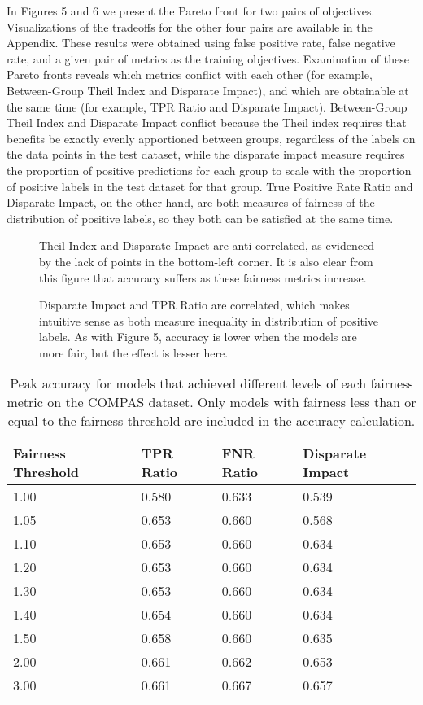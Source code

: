 \documentclass{elsarticle}
\newcommand{\figures}[4]{
	\begin{figure}[H]{
		\centering{
			\texttt{[image: \#1]}
		}
		\caption{#2}
		}
	\end{figure}
	\begin{figure}[H] {
		\centering{
			\texttt{[image: \#3]}
		}
		\caption{#4}
	}
	\end{figure}
}
\begin{document}
In Figures 5 and 6 we present the Pareto front for two pairs of objectives. Visualizations of the tradeoffs for the other four pairs are available in the Appendix. These results were obtained using false positive rate, false negative rate, and a given pair of metrics as the training objectives. Examination of these Pareto fronts reveals which metrics conflict with each other (for example, Between-Group Theil Index and Disparate Impact), and which are obtainable at the same time (for example, TPR Ratio and Disparate Impact). Between-Group Theil Index and Disparate Impact conflict because the Theil index requires that benefits be exactly evenly apportioned between groups, regardless of the labels on the data points in the test dataset, while the disparate impact measure requires the proportion of positive predictions for each group to scale with the proportion of positive labels in the test dataset for that group. True Positive Rate Ratio and Disparate Impact, on the other hand, are both measures of fairness of the distribution of positive labels, so they both can be satisfied at the same time. 

\figures{Between-Group Theil Index|Disparate Impact|COMPAS.png}{Theil Index and Disparate Impact are anti-correlated, as evidenced by the lack of points in the bottom-left corner. It is also clear from this figure that accuracy suffers as these fairness metrics increase.}{TPR Ratio|Disparate Impact|COMPAS.png}{Disparate Impact and TPR Ratio are correlated, which makes intuitive sense as both measure inequality in distribution of positive labels. As with Figure 5, accuracy is lower when the models are more fair, but the effect is lesser here.}


\renewcommand{\arraystretch}{1.5}
\begin{table}
	\begin{center}
	\begin{tabular}{| l | l | l | l |}
	\hline
	Fairness Threshold & TPR Ratio & FNR Ratio & Disparate Impact \\ \hline
	1.00  & 0.580 & 0.633 & 0.539 \\ \hline
	1.05  & 0.653 & 0.660 & 0.568 \\ \hline
	1.10  & 0.653 & 0.660 & 0.634 \\ \hline
	1.20  & 0.653 & 0.660 & 0.634 \\ \hline
	1.30  & 0.653 & 0.660 & 0.634 \\ \hline
	1.40  & 0.654 & 0.660 & 0.634 \\ \hline
	1.50  & 0.658 & 0.660 & 0.635 \\ \hline
	2.00  & 0.661 & 0.662 & 0.653 \\ \hline
	3.00  & 0.661 & 0.667 & 0.657 \\ \hline
	\end{tabular}
	\end{center}
\caption{Peak accuracy for models that achieved different levels of each fairness metric on the COMPAS dataset. Only models with fairness less than or equal to the fairness threshold are included in the accuracy calculation.}
\end{table}
\end{document}
